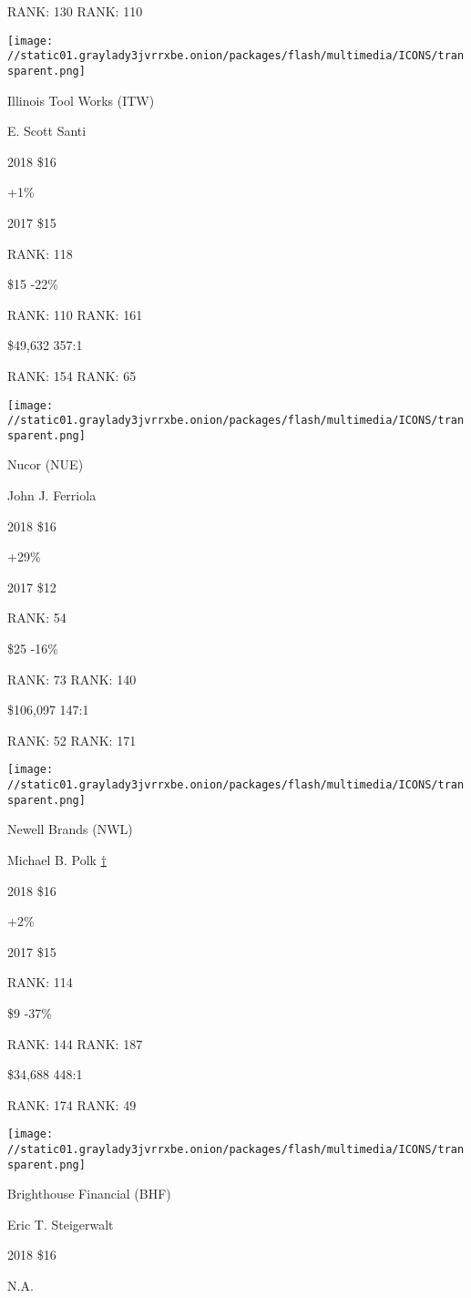 RANK: 130 RANK: 110

\texttt{[image: //static01.graylady3jvrrxbe.onion/packages/flash/multimedia/ICONS/transparent.png]}

Illinois Tool Works (ITW)

E. Scott Santi \protect\hyperlink{g-footnotes}{}

2018 \$16

 +1\%

2017 \$15

RANK: 118

 \$15 -22\%

RANK: 110 RANK: 161

 \$49,632 357:1

RANK: 154 RANK: 65

\texttt{[image: //static01.graylady3jvrrxbe.onion/packages/flash/multimedia/ICONS/transparent.png]}

Nucor (NUE)

John J. Ferriola \protect\hyperlink{g-footnotes}{}

2018 \$16

 +29\%

2017 \$12

RANK: 54

 \$25 -16\%

RANK: 73 RANK: 140

 \$106,097 147:1

RANK: 52 RANK: 171

\texttt{[image: //static01.graylady3jvrrxbe.onion/packages/flash/multimedia/ICONS/transparent.png]}

Newell Brands (NWL)

Michael B. Polk \protect\hyperlink{g-footnotes}{†}

2018 \$16

 +2\%

2017 \$15

RANK: 114

 \$9 -37\%

RANK: 144 RANK: 187

 \$34,688 448:1

RANK: 174 RANK: 49

\texttt{[image: //static01.graylady3jvrrxbe.onion/packages/flash/multimedia/ICONS/transparent.png]}

Brighthouse Financial (BHF)

Eric T. Steigerwalt \protect\hyperlink{g-footnotes}{}

2018 \$16

 N.A.

